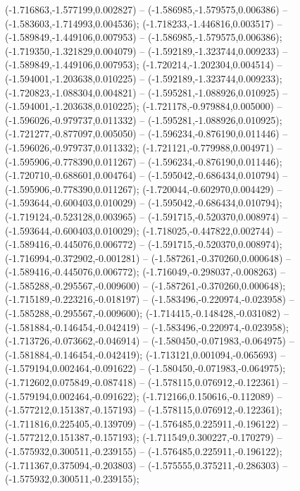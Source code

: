  (-1.716863,-1.577199,0.002827) -- (-1.586985,-1.579575,0.006386) -- (-1.583603,-1.714993,0.004536);
 (-1.718233,-1.446816,0.003517) -- (-1.589849,-1.449106,0.007953) -- (-1.586985,-1.579575,0.006386);
 (-1.719350,-1.321829,0.004079) -- (-1.592189,-1.323744,0.009233) -- (-1.589849,-1.449106,0.007953);
 (-1.720214,-1.202304,0.004514) -- (-1.594001,-1.203638,0.010225) -- (-1.592189,-1.323744,0.009233);
 (-1.720823,-1.088304,0.004821) -- (-1.595281,-1.088926,0.010925) -- (-1.594001,-1.203638,0.010225);
 (-1.721178,-0.979884,0.005000) -- (-1.596026,-0.979737,0.011332) -- (-1.595281,-1.088926,0.010925);
 (-1.721277,-0.877097,0.005050) -- (-1.596234,-0.876190,0.011446) -- (-1.596026,-0.979737,0.011332);
 (-1.721121,-0.779988,0.004971) -- (-1.595906,-0.778390,0.011267) -- (-1.596234,-0.876190,0.011446);
 (-1.720710,-0.688601,0.004764) -- (-1.595042,-0.686434,0.010794) -- (-1.595906,-0.778390,0.011267);
 (-1.720044,-0.602970,0.004429) -- (-1.593644,-0.600403,0.010029) -- (-1.595042,-0.686434,0.010794);
 (-1.719124,-0.523128,0.003965) -- (-1.591715,-0.520370,0.008974) -- (-1.593644,-0.600403,0.010029);
 (-1.718025,-0.447822,0.002744) -- (-1.589416,-0.445076,0.006772) -- (-1.591715,-0.520370,0.008974);
 (-1.716994,-0.372902,-0.001281) -- (-1.587261,-0.370260,0.000648) -- (-1.589416,-0.445076,0.006772);
 (-1.716049,-0.298037,-0.008263) -- (-1.585288,-0.295567,-0.009600) -- (-1.587261,-0.370260,0.000648);
 (-1.715189,-0.223216,-0.018197) -- (-1.583496,-0.220974,-0.023958) -- (-1.585288,-0.295567,-0.009600);
 (-1.714415,-0.148428,-0.031082) -- (-1.581884,-0.146454,-0.042419) -- (-1.583496,-0.220974,-0.023958);
 (-1.713726,-0.073662,-0.046914) -- (-1.580450,-0.071983,-0.064975) -- (-1.581884,-0.146454,-0.042419);
 (-1.713121,0.001094,-0.065693) -- (-1.579194,0.002464,-0.091622) -- (-1.580450,-0.071983,-0.064975);
 (-1.712602,0.075849,-0.087418) -- (-1.578115,0.076912,-0.122361) -- (-1.579194,0.002464,-0.091622);
 (-1.712166,0.150616,-0.112089) -- (-1.577212,0.151387,-0.157193) -- (-1.578115,0.076912,-0.122361);
 (-1.711816,0.225405,-0.139709) -- (-1.576485,0.225911,-0.196122) -- (-1.577212,0.151387,-0.157193);
 (-1.711549,0.300227,-0.170279) -- (-1.575932,0.300511,-0.239155) -- (-1.576485,0.225911,-0.196122);
 (-1.711367,0.375094,-0.203803) -- (-1.575555,0.375211,-0.286303) -- (-1.575932,0.300511,-0.239155);
